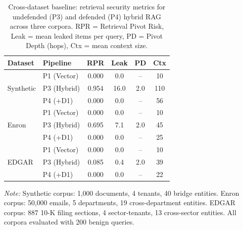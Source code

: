 \begin{table}[t]
\centering
\caption{Cross-dataset baseline: retrieval security metrics for undefended (P3)
and defended (P4) hybrid RAG across three corpora.
RPR = Retrieval Pivot Risk, Leak = mean leaked items per query,
PD = Pivot Depth (hops), Ctx = mean context size.}
\label{tab:cross-dataset}
\small
\begin{tabular}{ll|cccc}
\toprule
\textbf{Dataset} & \textbf{Pipeline} & \textbf{RPR} & \textbf{Leak} & \textbf{PD} & \textbf{Ctx} \\
\midrule
  \multirow{3}{*}{Synthetic} & P1 (Vector) & 0.000 & 0.0 & -- & 10 \\
                             & P3 (Hybrid) & 0.954 & 16.0 & 2.0 & 110 \\
                             & P4 (+D1)    & 0.000 & 0.0 & -- & 56 \\
\midrule
  \multirow{3}{*}{Enron}     & P1 (Vector) & 0.000 & 0.0 & -- & 10 \\
                             & P3 (Hybrid) & 0.695 & 7.1 & 2.0 & 45 \\
                             & P4 (+D1)    & 0.000 & 0.0 & -- & 25 \\
\midrule
  \multirow{3}{*}{EDGAR}     & P1 (Vector) & 0.000 & 0.0 & -- & 10 \\
                             & P3 (Hybrid) & 0.085 & 0.4 & 2.0 & 39 \\
                             & P4 (+D1)    & 0.000 & 0.0 & -- & 22 \\
\bottomrule
\end{tabular}
\vspace{2pt}
\begin{minipage}{0.95\linewidth}
\footnotesize
\textit{Note:} Synthetic corpus: 1{,}000 documents, 4 tenants, 40 bridge entities.
Enron corpus: 50{,}000 emails, 5 departments, 19 cross-department entities.
EDGAR corpus: 887 10-K filing sections, 4 sector-tenants, 13 cross-sector entities.
All corpora evaluated with 200 benign queries.
\end{minipage}
\end{table}
